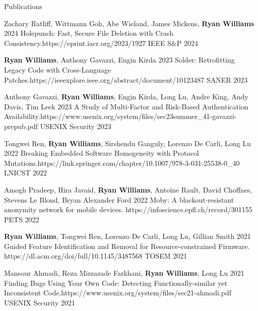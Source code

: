 \documentclass[]{cv}
\begin{document}
\begin{section}{Publications}

\begin{pub}
    {Zachary Ratliff, Wittmann Goh, Abe Wieland, James Mickens, \textbf{Ryan Williams}}
    {2024}
    {Holepunch: Fast, Secure File Deletion with Crash Consistency.}{https://eprint.iacr.org/2023/1927}
    {IEEE S&P 2024}
\end{pub}

\begin{pub}
    {\textbf{Ryan Williams}, Anthony Gavazzi, Engin Kirda}
    {2023}
    {Solder: Retrofitting Legacy Code with Cross-Language Patches.}{https://ieeexplore.ieee.org/abstract/document/10123487}
    {SANER 2023}
\end{pub}

\begin{pub}
    {Anthony Gavazzi, \textbf{Ryan Williams}, Engin Kirda, Long Lu, Andre King, Andy Davis, Tim Leek}
    {2023}
    {A Study of Multi-Factor and Risk-Based Authentication Availability.}{https://www.usenix.org/system/files/sec23summer_41-gavazzi-prepub.pdf}
    {USENIX Security 2023}
\end{pub}

\begin{pub}
    {Tongwei Ren, \textbf{Ryan Williams}, Sirshendu Ganguly, Lorenzo De Carli, Long Lu}
    {2022}
    {Breaking Embedded Software Homogeneity with Protocol Mutations.}{https://link.springer.com/chapter/10.1007/978-3-031-25538-0_40}
    {LNICST 2022}
\end{pub}

\begin{pub}
    {Amogh Pradeep, Hira Javaid, \textbf{Ryan Williams}, Antoine Rault, David Choffnes, Stevens Le Blond, Bryan Alexander Ford}
    {2022}
    {Moby: A blackout-resistant anonymity network for mobile devices.}
    {https://infoscience.epfl.ch/record/301155}
    {PETS 2022}
\end{pub}

\begin{pub}
    {\textbf{Ryan Williams}, Tongwei Ren, Lorenzo De Carli, Long Lu, Gillian Smith}
    {2021}
    {Guided Feature Identification and Removal for Resource-constrained Firmware.}
    {https://dl.acm.org/doi/full/10.1145/3487568}
    {TOSEM 2021}
\end{pub}

\begin{pub}
    {Mansour Ahmadi, Reza Mirzazade Farkhani, \textbf{Ryan Williams}, Long Lu}
    {2021}
    {Finding Bugs Using Your Own Code: Detecting Functionally-similar yet Inconsistent Code.}{https://www.usenix.org/system/files/sec21-ahmadi.pdf}
    {USENIX Security 2021}
\end{pub}


\end{section}
\end{document}
